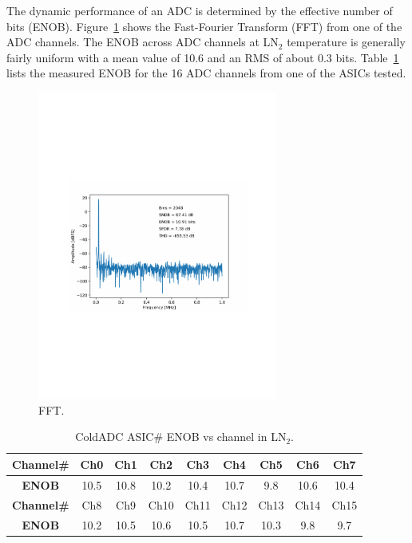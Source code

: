 \label{sec:4.3}


The dynamic performance of an ADC is determined by the effective number of bits (ENOB). Figure~\ref{fig:coldadc_fft} shows the Fast-Fourier Transform (FFT) from one of the ADC channels.  The ENOB across ADC channels at LN$_2$ temperature is generally fairly uniform with a mean value of 10.6 and an RMS of about 0.3 bits. Table~\ref{tab:adc_enob} lists the measured ENOB for the 16 ADC channels from one of the ASICs tested.
\begin{figure}[htb]
\centering
\begin{center}
\includegraphics[width=0.7\textwidth]{figures/fft_Sinusoid_20KHz_SE-SHA-ADC0_NomVREFPN_2M_v1.pdf}
\end{center}
\caption{FFT.}
\label{fig:coldadc_fft}
\end{figure}

\begin{table}[htb]
\centering
\begin{tabular}{|c|c|c|c|c|c|c|c|c|}
\hline
\textbf{ Channel\# } & Ch0&Ch1&Ch2&Ch3 &Ch4 &Ch5 &Ch6 &Ch7 \\ \hline 
\textbf{ ENOB } & 10.5 & 10.8 & 10.2 & 10.4 & 10.7 & 9.8 & 10.6 & 10.4\\ \hline \hline
\textbf{ Channel\# } & Ch8&Ch9&Ch10&Ch11 &Ch12 &Ch13 &Ch14 &Ch15 \\ \hline
\textbf{ ENOB } & 10.2 & 10.5  & 10.6 & 10.5 & 10.7 & 10.3 & 9.8 & 9.7 \\ \hline
\end{tabular}
\caption{ColdADC ASIC\# ENOB vs channel in LN$_2$.}
\label{tab:adc_enob}
\end{table}


